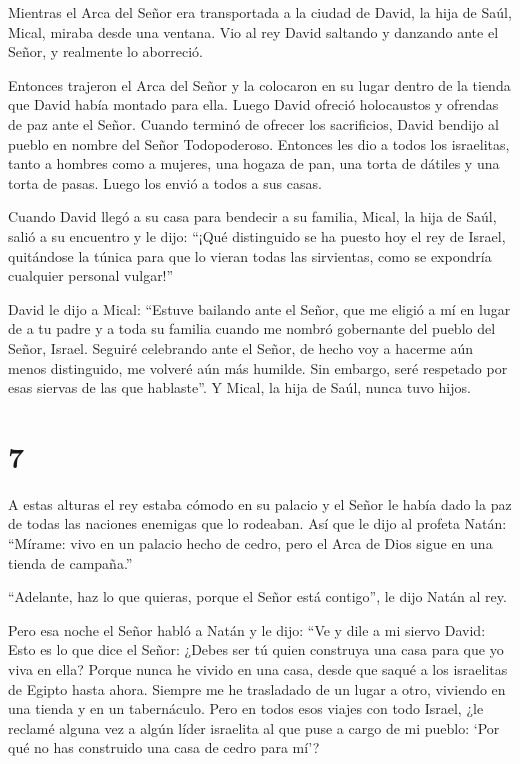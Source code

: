  Mientras el Arca del Señor era transportada a la ciudad de
David, la hija de Saúl, Mical, miraba desde una ventana. Vio al rey
David saltando y danzando ante el Señor, y realmente lo aborreció.

 Entonces trajeron el Arca del Señor y la colocaron en su
lugar dentro de la tienda que David había montado para ella. Luego David
ofreció holocaustos y ofrendas de paz ante el Señor. 
Cuando terminó de ofrecer los sacrificios, David bendijo al pueblo en
nombre del Señor Todopoderoso.  Entonces les dio a todos
los israelitas, tanto a hombres como a mujeres, una hogaza de pan, una
torta de dátiles y una torta de pasas. Luego los envió a todos a sus
casas.

 Cuando David llegó a su casa para bendecir a su familia,
Mical, la hija de Saúl, salió a su encuentro y le dijo: ``¡Qué
distinguido se ha puesto hoy el rey de Israel, quitándose la túnica para
que lo vieran todas las sirvientas, como se expondría cualquier personal
vulgar!''

 David le dijo a Mical: ``Estuve bailando ante el Señor,
que me eligió a mí en lugar de a tu padre y a toda su familia cuando me
nombró gobernante del pueblo del Señor, Israel. Seguiré celebrando ante
el Señor,  de hecho voy a hacerme aún menos distinguido, me
volveré aún más humilde. Sin embargo, seré respetado por esas siervas de
las que hablaste''.  Y Mical, la hija de Saúl, nunca tuvo
hijos.

\hypertarget{section-6}{%
\section{7}\label{section-6}}

 A estas alturas el rey estaba cómodo en su palacio y el
Señor le había dado la paz de todas las naciones enemigas que lo
rodeaban.  Así que le dijo al profeta Natán: ``Mírame: vivo
en un palacio hecho de cedro, pero el Arca de Dios sigue en una tienda
de campaña.''

 ``Adelante, haz lo que quieras, porque el Señor está
contigo'', le dijo Natán al rey.

 Pero esa noche el Señor habló a Natán y le dijo:
 ``Ve y dile a mi siervo David: Esto es lo que dice el
Señor: ¿Debes ser tú quien construya una casa para que yo viva en ella?
 Porque nunca he vivido en una casa, desde que saqué a los
israelitas de Egipto hasta ahora. Siempre me he trasladado de un lugar a
otro, viviendo en una tienda y en un tabernáculo.  Pero en
todos esos viajes con todo Israel, ¿le reclamé alguna vez a algún líder
israelita al que puse a cargo de mi pueblo: `Por qué no has construido
una casa de cedro para mí'?


